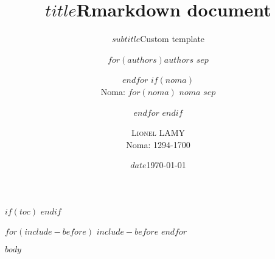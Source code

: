 \documentclass[a4paper, 12pt]{article}
\title{$title$}
\title{Rmarkdown document}
\subtitle{$subtitle$}
\subtitle{Custom template}
\author{$for(authors)$\textsc{$authors$} $sep$ \and $endfor$ $if(noma)$ \\ Noma: $for(noma)$ $noma$ $sep$ \and $endfor$ $endif$}
\author{\textsc{Lionel LAMY} \\ Noma: 1294-1700}
\institute{$institute$}
\institute{Université catholique de Louvain}
\date{$date$}
\date{\today}
\begin{document}
    \maketitle
    $if(toc)$
    {
     \setcounter{tocdepth}{$toc-depth$}
     \romantableofcontents
    }
    $endif$
    
    $for(include-before)$
        $include-before$
    $endfor$


    $body$
\end{document}
